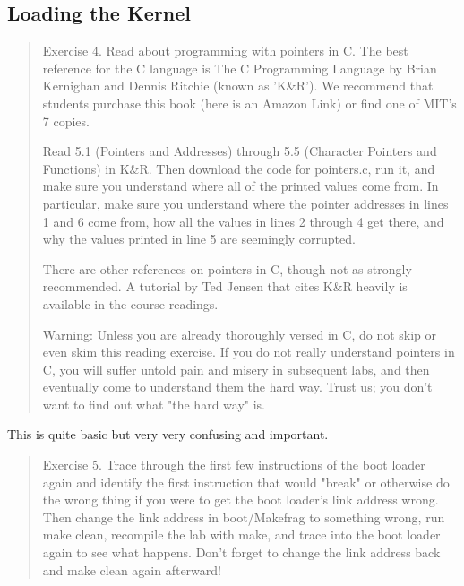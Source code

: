 \documentclass[10pt]{article}
\begin{document}
	\subsection{Loading the Kernel}
	\begin{quote}	
	\begin{colorboxed}
	Exercise 4. Read about programming with pointers in C. The best reference for the C language is The C Programming Language by Brian Kernighan and Dennis Ritchie (known as 'K&R'). We recommend that students purchase this book (here is an Amazon Link) or find one of MIT's 7 copies.

	Read 5.1 (Pointers and Addresses) through 5.5 (Character Pointers and Functions) in K&R. Then download the code for pointers.c, run it, and make sure you understand where all of the printed values come from. In particular, make sure you understand where the pointer addresses in lines 1 and 6 come from, how all the values in lines 2 through 4 get there, and why the values printed in line 5 are seemingly corrupted.

	There are other references on pointers in C, though not as strongly recommended. A tutorial by Ted Jensen that cites K&R heavily is available in the course readings.

	Warning: Unless you are already thoroughly versed in C, do not skip or even skim this reading exercise. If you do not really understand pointers in C, you will suffer untold pain and misery in subsequent labs, and then eventually come to understand them the hard way. Trust us; you don't want to find out what "the hard way" is. 
	\end{colorboxed}
	\end{quote}

	\begin{flushleft}
		This is quite basic but very very confusing and important.
	\end{flushleft}

	\begin{quote}	
	\begin{colorboxed}
	Exercise 5. Trace through the first few instructions of the boot loader again and identify the first instruction that would "break" or otherwise do the wrong thing if you were to get the boot loader's link address wrong. Then change the link address in boot/Makefrag to something wrong, run make clean, recompile the lab with make, and trace into the boot loader again to see what happens. Don't forget to change the link address back and make clean again afterward!
	\end{colorboxed}
	\end{quote}

	\begin{flushleft}
		
	\end{flushleft}
\end{document}
